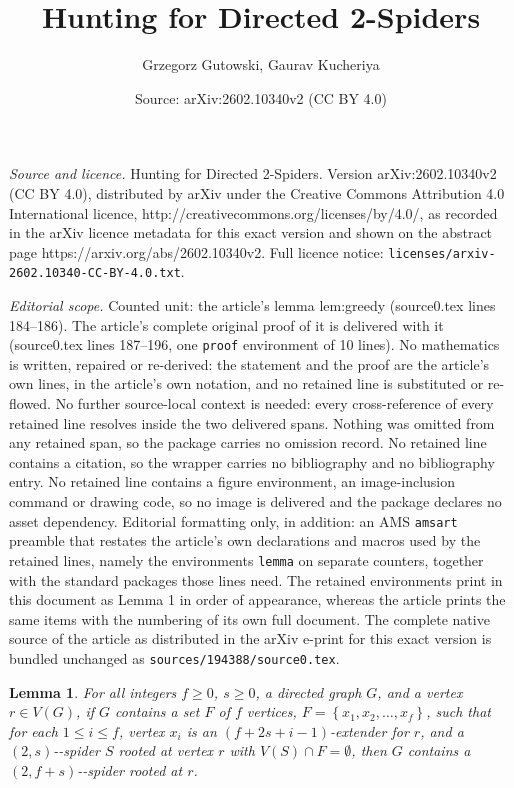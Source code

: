 \documentclass[10pt,a4paper]{amsart}
\title{Hunting for Directed 2-Spiders}
\author{Grzegorz Gutowski, Gaurav Kucheriya}
\date{Source: arXiv:2602.10340v2 (CC BY 4.0)}
\providecommand{\nobreakdash}{\nobreak\hbox{-}}
\newtheorem{lemma}{Lemma}
\newcommand{\set}[1]{{\left\{#1\right\}}}
\begin{document}
\maketitle

\noindent\emph{Source and licence.} Hunting for Directed 2-Spiders. Version arXiv:2602.10340v2 (CC BY 4.0), distributed by arXiv under the Creative Commons Attribution 4.0 International licence, http://creativecommons.org/licenses/by/4.0/, as recorded in the arXiv licence metadata for this exact version and shown on the abstract page https://arxiv.org/abs/2602.10340v2. Full licence notice: \texttt{licenses/arxiv-2602.10340-CC-BY-4.0.txt}.\par\smallskip

\noindent\textit{Editorial scope.} Counted unit: the article's lemma lem:greedy (source0.tex lines 184--186). The article's complete original proof of it is delivered with it (source0.tex lines 187--196, one \texttt{proof} environment of 10 lines). No mathematics is written, repaired or re-derived: the statement and the proof are the article's own lines, in the article's own notation, and no retained line is substituted or re-flowed.  No further source-local context is needed: every cross-reference of every retained line resolves inside the two delivered spans.  Nothing was omitted from any retained span, so the package carries no omission record.  No retained line contains a citation, so the wrapper carries no bibliography and no bibliography entry.  No retained line contains a figure environment, an image-inclusion command or drawing code, so no image is delivered and the package declares no asset dependency.  Editorial formatting only, in addition: an AMS \texttt{amsart} preamble that restates the article's own declarations and macros used by the retained lines, namely the environments \texttt{lemma} on separate counters, together with the standard packages those lines need.  The retained environments print in this document as Lemma 1 in order of appearance, whereas the article prints the same items with the numbering of its own full document.  The complete native source of the article as distributed in the arXiv e-print for this exact version is bundled unchanged as \texttt{sources/194388/source0.tex}.
\begin{lemma}\label{lem:greedy}
    For all integers $f \ge 0$, $s \ge 0$, a directed graph $G$, and a vertex $r \in V(G)$, if $G$ contains a set $F$ of $f$ vertices, $F = \set{x_1,x_2,\ldots,x_f}$, such that for each $1\le i \le f$, vertex $x_i$ is an $(f+2s+i-1)$-extender for $r$, and a $(2,s)$\nobreakdash-spider $S$ rooted at vertex $r$ with $V(S) \cap F = \emptyset$, then $G$ contains a $(2,f+s)$\nobreakdash-spider rooted at $r$.
\end{lemma}
\end{document}
